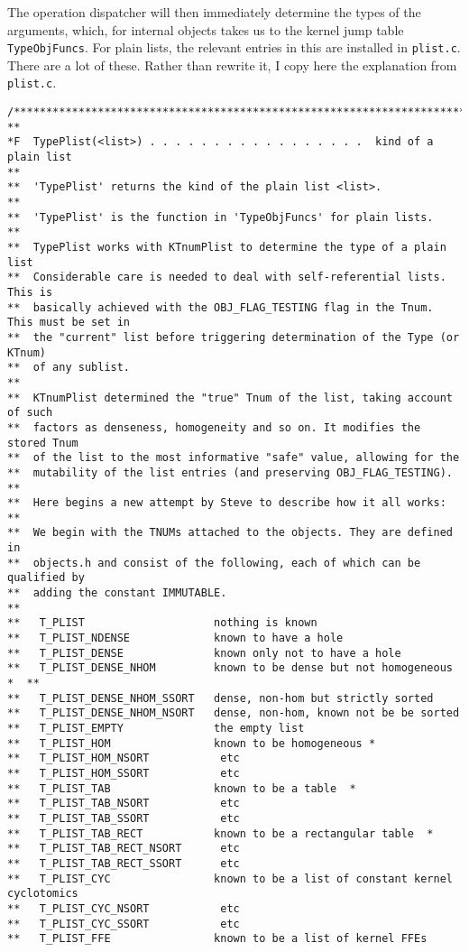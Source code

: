 \documentclass{article}
\begin{document}
The operation dispatcher will then immediately determine the types of
the arguments, which, for internal objects takes us to the kernel
jump table \verb|TypeObjFuncs|. For plain lists, the relevant entries
in this are installed in \verb|plist.c|. There are a lot of
these. Rather than rewrite it, I copy here the  explanation from
\verb|plist.c|.
\begin{verbatim}
/****************************************************************************
**
*F  TypePlist(<list>) . . . . . . . . . . . . . . . . .  kind of a plain list
**
**  'TypePlist' returns the kind of the plain list <list>.
**
**  'TypePlist' is the function in 'TypeObjFuncs' for plain lists.
**
**  TypePlist works with KTnumPlist to determine the type of a plain list
**  Considerable care is needed to deal with self-referential lists. This is
**  basically achieved with the OBJ_FLAG_TESTING flag in the Tnum. This must be set in
**  the "current" list before triggering determination of the Type (or KTnum)
**  of any sublist.
**
**  KTnumPlist determined the "true" Tnum of the list, taking account of such
**  factors as denseness, homogeneity and so on. It modifies the stored Tnum
**  of the list to the most informative "safe" value, allowing for the
**  mutability of the list entries (and preserving OBJ_FLAG_TESTING).
**
**  Here begins a new attempt by Steve to describe how it all works:
**
**  We begin with the TNUMs attached to the objects. They are defined in
**  objects.h and consist of the following, each of which can be qualified by
**  adding the constant IMMUTABLE.
**
**   T_PLIST                    nothing is known
**   T_PLIST_NDENSE             known to have a hole
**   T_PLIST_DENSE              known only not to have a hole
**   T_PLIST_DENSE_NHOM         known to be dense but not homogeneous *  **
**   T_PLIST_DENSE_NHOM_SSORT   dense, non-hom but strictly sorted
**   T_PLIST_DENSE_NHOM_NSORT   dense, non-hom, known not be be sorted
**   T_PLIST_EMPTY              the empty list
**   T_PLIST_HOM                known to be homogeneous *
**   T_PLIST_HOM_NSORT           etc
**   T_PLIST_HOM_SSORT           etc
**   T_PLIST_TAB                known to be a table  *
**   T_PLIST_TAB_NSORT           etc
**   T_PLIST_TAB_SSORT           etc
**   T_PLIST_TAB_RECT           known to be a rectangular table  *
**   T_PLIST_TAB_RECT_NSORT      etc
**   T_PLIST_TAB_RECT_SSORT      etc
**   T_PLIST_CYC                known to be a list of constant kernel cyclotomics
**   T_PLIST_CYC_NSORT           etc
**   T_PLIST_CYC_SSORT           etc
**   T_PLIST_FFE                known to be a list of kernel FFEs

\end{verbatim}
\end{document}
